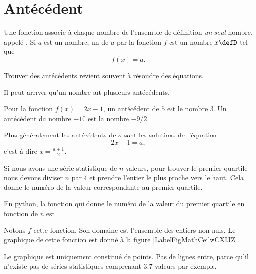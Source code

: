 \section{Antécédent}

\begin{Aretenir}
Une fonction associe à chaque nombre de l'ensemble de définition \emph{un seul} nombre, appelé . Si \( a\) est un nombre, un  de \( a\) par la fonction \( f\) est un nombre \( x\defD\) tel que 
\begin{equation}
    f(x)=a.
\end{equation}
\end{Aretenir}
Trouver des antécédents revient souvent à résoudre des équations.

Il peut arriver qu'un nombre ait plusieurs antécédents.

\begin{example}
    Pour la fonction \( f(x)=2x-1\), un antécédent de \( 5\) est le nombre \( 3\). Un antécédent du nombre \( -10\) est la nombre \( -9/2\).

    Plus généralement les antécédents de \( a\) sont les solutions de l'équation
    \begin{equation}
        2x-1=a,
    \end{equation}
    c'est à dire \( x=\frac{ a+1 }{2}\).
\end{example}

\begin{example} \label{EqlaIGDz}
    Si nous avons une série statistique de \( n\) valeurs, pour trouver le premier quartile nous devons diviser \( n\) par \( 4\) et prendre l'entier le plus proche vers le haut. Cela donne le numéro de la valeur correspondante au premier quartile.

    En python, la fonction qui donne le numéro de la valeur du premier quartile en fonction de \( n\) est
    \begin{quote}
    \end{quote}
    Notons \( f\) cette fonction. Son domaine est l'ensemble des entiers non nuls. Le graphique de cette fonction est donné à la figure \ref{LabelFigMathCeilwCXIJZ}.
\newcommand{\CaptionFigMathCeilwCXIJZ}{Le numéro de la valeur du premier quartile en fonction du nombre de valeurs.}


    Le graphique est uniquement constitué de points. Pas de lignes entre, parce qu'il n'existe pas de séries statistiques comprenant \( 3.7\) valeurs par exemple. 
\end{example}

